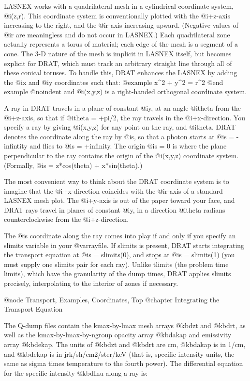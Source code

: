 LASNEX works with a quadrilateral mesh in a cylindrical coordinate
system, @i{(z,r)}.  This coordinate system is conventionally plotted
with the @i{+z}-axis increasing to the right, and the @i{r}-axis
increasing upward.  (Negative values of @i{r} are meaningless and do not
occur in LASNEX.)  Each quadrilateral zone actually represents a torus
of material; each edge of the mesh is a segment of a cone.  The 3-D
nature of the mesh is implicit in LASNEX itself, but becomes explicit
for DRAT, which must track an arbitrary straight line through all of
these conical toruses.  To handle this, DRAT enhances the LASNEX by
adding the @i{x} and @i{y} coordinates such that:
@example
x^2 + y^2 = r^2
@end example
@noindent
and @i{(x,y,z)} is a right-handed orthogonal coordinate system.

A ray in DRAT travels in a plane of constant @i{y}, at an angle
@i{theta} from the @i{+z}-axis, so that if @i{theta = +pi/2}, the ray
travels in the @i{+x}-direction.  You specify a ray by giving
@i{(x,y,z)} for any point on the ray, and @i{theta}.  DRAT denotes the
coordinate along the ray by @i{s}, so that a photon starts at @i{s =
-infintity} and flies to @i{s = +infinity}.  The origin @i{s = 0} is
where the plane perpendicular to the ray contains the origin of the
@i{(x,y,z)} coordinate system.  (Formally, @i{s = z*cos(theta) +
x*sin(theta)}.)

The most convenient way to think about the DRAT coordinate system is to
imagine that the @i{+x}-direction coincides with the @i{r}-axis of a
standard LASNEX mesh plot.  The @i{+y}-axis is out of the paper toward
your face, and DRAT rays travel in planes of constant @i{y}, in a
direction @i{theta} radians counterclockwise from the @i{+z}-direction.

The @i{s} coordinate along the ray comes into play if and only if you
specify an slimits variable in your @var{rayfile}.  If slimits is
present, DRAT starts integrating the transport equation at @i{s} =
slimits(0), and stops at @i{s} = slimits(1) (you must supply one
slimits pair for each ray).  Unlike tlimits (the problem time limits),
which have the granularity of the dump times, DRAT applies slimits
precisely, interpolating to the interior of zones if necessary.

@node Transport, Examples, Coordinates, Top
@chapter Integrating the Transport Equation

The Q-dump files contain the kmax-by-lmax mesh arrays @kbd{zt} and
@kbd{rt}, as well as the kmax-by-lmax-by-ngroup opacity array
@kbd{akap} and emissivity array @kbd{ekap}.  The units of @kbd{zt}
and @kbd{rt} are cm, @kbd{akap} is in 1/cm, and @kbd{ekap} is in
jrk/sh/cm2/ster/keV (that is, specific intensity units, the same as
sigma times temperature to the fourth power).  The differential
equation for the specific intensity @kbd{Inu} along a ray is:

